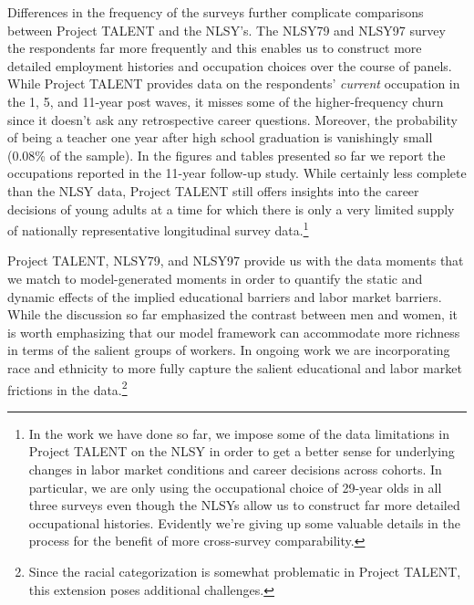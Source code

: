 \documentclass[onehalfspacing,11pt]{article}
\begin{document}
	Differences in the frequency of the surveys further complicate comparisons between Project TALENT and the NLSY's. The NLSY79 and NLSY97 survey the respondents far more frequently and this enables us to construct more detailed employment histories and occupation choices over the course of panels. While Project TALENT provides data on the respondents' {\it current} occupation in the 1, 5, and 11-year post waves, it misses some of the higher-frequency churn since it doesn't ask any retrospective career questions. Moreover, the probability of being a teacher one year after high school graduation is vanishingly small (0.08\% of the sample). In the figures and tables presented so far we report the occupations reported in the 11-year follow-up study. While certainly less complete than the NLSY data, Project TALENT still offers insights into the career decisions of young adults at a time for which there is only a very limited supply of nationally representative longitudinal survey data.\footnote{In the work we have done so far, we impose some of the data limitations in Project TALENT on the NLSY in order to get a better sense for underlying changes in labor market conditions and career decisions across cohorts. In particular, we are only using the occupational choice of 29-year olds in all three surveys even though the NLSYs allow us to construct far more detailed occupational histories. Evidently we're giving up some valuable details in the process for the benefit of more cross-survey comparability.}
	
	Project TALENT, NLSY79, and NLSY97 provide us with the data moments that we match to model-generated moments in order to quantify the static and dynamic effects of the implied educational barriers and labor market barriers. While the discussion so far emphasized the contrast between men and women, it is worth emphasizing that our model framework can accommodate more richness in terms of the salient groups of workers. In ongoing work we are incorporating race and ethnicity to more fully capture the salient educational and labor market frictions in the data.\footnote{Since the racial categorization is somewhat problematic in Project TALENT, this extension poses additional challenges.}
	
\end{document}
